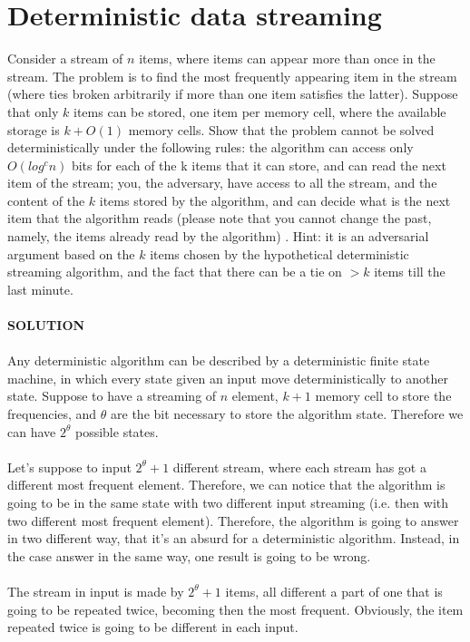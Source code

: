 \documentclass[a4paper]{article}
\begin{document}
\section*{Deterministic data streaming}
Consider a stream of $n$ items, where items can appear more than once in the stream. The problem is to find the most frequently appearing item in the stream (where ties broken arbitrarily if more than one item satisfies the latter). Suppose that only $k$ items can be stored, one item per memory cell, where the available storage is $k + O(1)$ memory cells. Show that the problem cannot be solved deterministically under the following rules: the algorithm can access only $O(log^c n)$ bits for each of the k items that it can store, and can read the next item of the stream; you, the adversary, have access to all the stream, and the content of the $k$ items stored by the algorithm, and can decide what is the next item that the algorithm reads (please note that you cannot change the past, namely, the items already read by the algorithm) . Hint: it is an adversarial argument based on the $k$ items chosen by the hypothetical deterministic streaming algorithm, and the fact that there can be a tie on $> k$ items till the last minute.
\\
\\
\textbf{SOLUTION}
\\
\\
Any deterministic algorithm can be described by a deterministic finite state machine, in which every state given an input move deterministically to another state. 
Suppose to have a streaming of $n$ element, $k+1$ memory cell to store the frequencies, and $\theta$ are the bit necessary to store the algorithm state. Therefore we can have $2^{\theta}$ possible states. \\
\\
Let's suppose to input $2^{\theta}+1$ different stream, where each stream has got a different most frequent element. Therefore, we can notice that the algorithm is going to be in the same state with two different input streaming (i.e. then with two different most frequent element). 
Therefore, the algorithm is going to answer in two different way, that it's an absurd for a deterministic algorithm. Instead, in the case answer in the same way, one result is going to be wrong. 
\\
\\
The stream in input is made by $2^{\theta}+1$ items, all different a part of one that is going to be repeated twice, becoming then the most frequent. Obviously, the item	repeated twice is going to be different in each input. 
\end{document}
